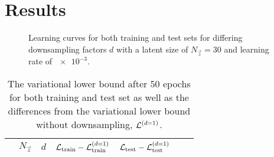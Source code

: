 \section{Results}
\label{sec:results}


\begin{figure*}
    \centering
	\hspace*{\fill}
    \hfill
	\hspace*{\fill}
    \caption{Learning curves for both training and test sets for differing downsampling factors $d$ with a latent size of $N_{\vec{z}} = 30$ and learning rate of $\num{e-3}$. }
    \label{fig:learning_curves}
\end{figure*}


\begin{table}
    \centering
    \caption{
        The variational lower bound after $50$ epochs for both training and test set as well as the differences from the variational lower bound without downsampling, $\mathcal{L}^{(d = 1)}$.
    }
    \label{tab:variational_lower_bound}
    \begin{tabular}{
            l@{}
            S[table-format = 2.0]
            S[table-format = 1.0]
            S[table-format = -3.2]
            S[table-format = -3.2]
            S[table-format = -2.2]
            S[table-format = -2.2]
        }
        \toprule
        & {$N_{\vec{z}}$} & {$d$}
        & {$\mathcal{L}_{\text{train}} - \mathcal{L}_{\text{train}}^{(d = 1)}$}
        & {$\mathcal{L}_{\text{test}} - \mathcal{L}_{\text{test}}^{(d = 1)}$} \\
        \midrule
        
        \bottomrule
    \end{tabular}
\end{table}

